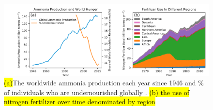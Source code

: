 \begin{figure}
    \centering
    \includegraphics[width=1\textwidth]{Figures/ammonia_production_2.pdf}
    \caption{\hl{(a)}The worldwide ammonia production each year since 1946 \cite{Kelly_2005} and \% of individuals who are undernourished globally \cite{owidhungerandundernourishment}. \hl{(b) the use of nitrogen fertilizer over time denominated by region }\cite{owidfertilizerandpesticides}}
    \label{fig:ammonia_prod}
\end{figure}







